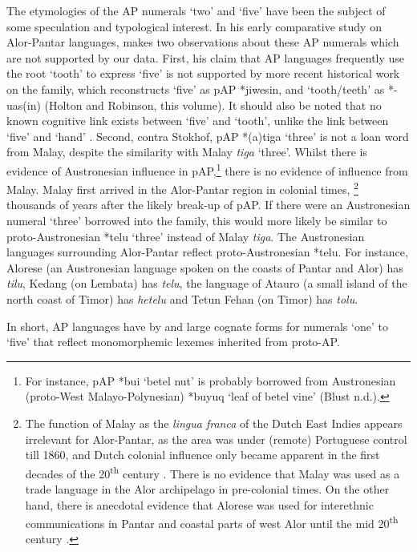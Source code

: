 \documentclass[output=paper]{LSP/langsci}
\begin{document}
The etymologies of the AP numerals `two' and `five' have been the subject of some speculation and typological interest. In his early comparative study on Alor-Pantar languages, \citet[21]{Stokhof1975} makes two observations about these AP numerals which are not supported by our data. First, his claim that AP languages frequently use the root `tooth' to express `five' is not supported by more recent historical work on the family, which reconstructs `five' as pAP *jiwesin, and `tooth/teeth' as *-uas(in) (Holton and Robinson, this volume). It should also be noted that no known cognitive link exists between `five' and `tooth', unlike the link between `five' and `hand' \citep{Majewicz1981,Majewicz1984,Heine1997}. Second, contra Stokhof, pAP *(a)tiga `three' is not a loan word from Malay, despite the similarity with Malay \textit{tiga} `three'. Whilst there is evidence of Austronesian influence in pAP,\footnote{{}   For instance, pAP *bui `betel nut' is probably borrowed from Austronesian (proto-West Malayo-Polynesian) *buyuq `leaf of betel vine' (Blust n.d.).}   there is no evidence of influence from Malay. Malay first arrived in the Alor-Pantar region in colonial times,{} \footnote{{}   The function of Malay as the \textit{lingua franca} of the Dutch East Indies appears irrelevant for Alor-Pantar, as the area was under (remote) Portuguese control till 1860, and Dutch colonial influence only became apparent in the first decades of the 20\textsuperscript{th} century \citep[14 and references cited there]{Klamer2010}. There is no evidence that Malay was used as a trade language in the Alor archipelago in pre-colonial times. On the other hand, there is anecdotal evidence that Alorese was used for interethnic communications in Pantar and coastal parts of west Alor until the mid 20\textsuperscript{th} century \citep{Klamer2011}.}  thousands of years after the likely break-up of pAP. If there were an Austronesian numeral `three' borrowed into the family, this would more likely be similar to proto-Austronesian  *telu `three' \citep[268]{Blust2009} instead of Malay \textit{tiga}. The Austronesian languages surrounding Alor-Pantar reflect proto-Austronesian *telu. For instance, Alorese (an Austronesian language spoken on the coasts of Pantar and Alor) has \textit{tilu}, Kedang (on Lembata) has \textit{telu}, the language of Atauro (a small island of the north coast of Timor) has \textit{hetelu} and Tetun Fehan (on Timor) has \textit{tolu}.

In short, AP languages have by and large cognate forms for numerals `one' to `five' that reflect monomorphemic lexemes inherited from proto-AP. 
\end{document}

